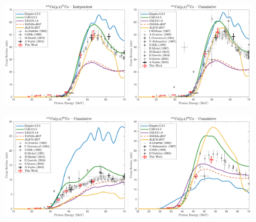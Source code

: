 \begin{figure}
 \centering
 \includegraphics[width=0.49\textwidth]{./figures/57Co_ind.pdf}
 \includegraphics[width=0.49\textwidth]{./figures/57Co_cum.pdf}
 
 
 \includegraphics[width=0.49\textwidth]{./figures/60Co.pdf}
 \includegraphics[width=0.49\textwidth]{./figures/60Cu.pdf}
 

\end{figure}
